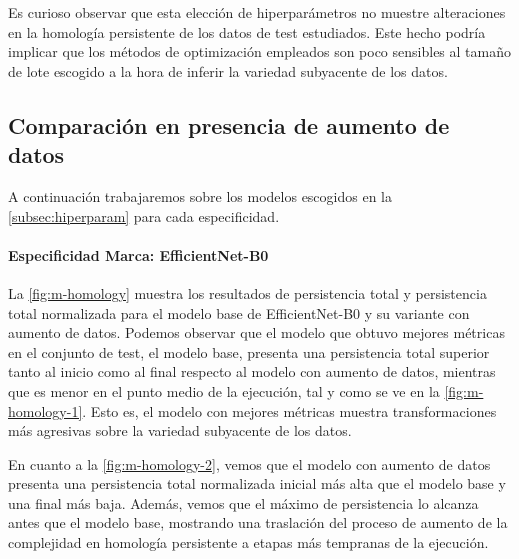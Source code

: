 Es curioso observar que esta elección de hiperparámetros no muestre alteraciones
en la homología persistente de los datos de test estudiados. Este hecho podría implicar
que los métodos de optimización empleados son poco sensibles al tamaño de lote escogido
a la hora de inferir la variedad subyacente de los datos.

\subsection{Comparación en presencia de aumento de datos}
\label{subsec:aug}

A continuación trabajaremos sobre los modelos escogidos en la
\autoref{subsec:hiperparam} para cada especificidad.

\paragraph{Especificidad Marca: EfficientNet-B0}

La \autoref{fig:m-homology} muestra los resultados de persistencia total y
persistencia total normalizada para el modelo base de EfficientNet-B0 y su
variante con aumento de datos. Podemos observar que el modelo que obtuvo mejores
métricas en el conjunto de test, el modelo base, presenta una persistencia total
superior tanto al inicio como al final respecto al modelo con aumento de datos,
mientras que es menor en el punto medio de la ejecución, tal y como se ve en la \autoref{fig:m-homology-1}.
Esto es, el modelo con mejores métricas muestra transformaciones más agresivas sobre
la variedad subyacente de los datos.

En cuanto a la \autoref{fig:m-homology-2}, vemos que el modelo con aumento de
datos presenta una persistencia total normalizada inicial más alta que el modelo
base y una final más baja. Además, vemos que el máximo de persistencia lo
alcanza antes que el modelo base, mostrando una traslación del proceso de aumento
de la complejidad en homología persistente a etapas más tempranas de la ejecución.

